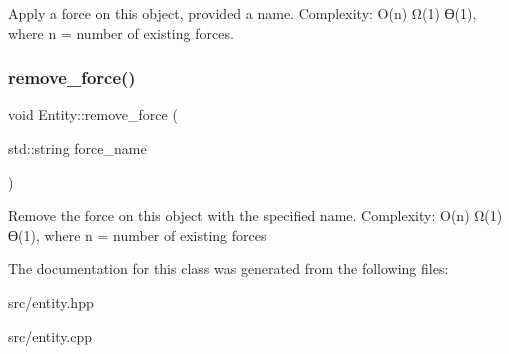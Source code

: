 Apply a force on this object, provided a name. Complexity\+: O(n) Ω(1) ϴ(1), where n = number of existing forces. \mbox{\label{class_entity_a2bdf4edf238deca2feaffed91c25ad8a}} 
\subsubsection{\texorpdfstring{remove\+\_\+force()}{remove\_force()}}
{\footnotesize\ttfamily void Entity\+::remove\+\_\+force (\begin{DoxyParamCaption}\item[{std\+::string}]{force\+\_\+name }\end{DoxyParamCaption})}

Remove the force on this object with the specified name. Complexity\+: O(n) Ω(1) ϴ(1), where n = number of existing forces 

The documentation for this class was generated from the following files\+:\begin{DoxyCompactItemize}
\item 
src/entity.\+hpp\item 
src/entity.\+cpp\end{DoxyCompactItemize}
